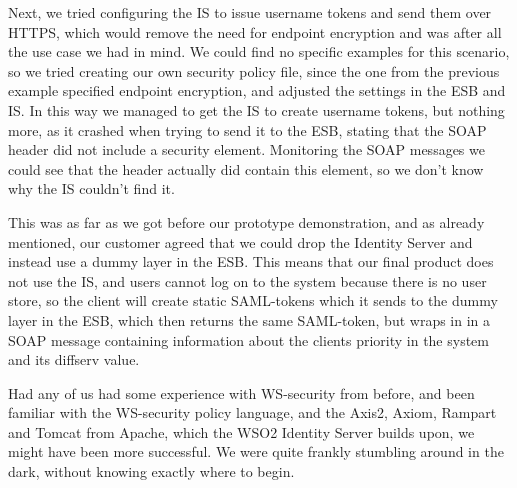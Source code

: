     Next, we tried configuring the IS to issue username tokens and send them over HTTPS, which would remove the need for endpoint encryption and was after all the use case we had in mind. We could find no specific examples for this scenario, so we tried creating our own security policy file, since the one from the previous example specified endpoint encryption, and adjusted the settings in the ESB and IS. In this way we managed to get the IS to create username tokens, but nothing more, as it crashed when trying to send it to the ESB, stating that the SOAP header did not include a security element. Monitoring the SOAP messages we could see that the header actually did contain this element, so we don't know why the IS couldn't find it.

    This was as far as we got before our prototype demonstration, and as already mentioned, our customer agreed that we could drop the Identity Server and instead use a dummy layer in the ESB. This means that our final product does not use the IS, and users cannot log on to the system because there is no user store, so the client will create static SAML-tokens which it sends to the dummy layer in the ESB, which then returns the same SAML-token, but wraps in in a SOAP message containing information about the clients priority in the system and its diffserv value.

    Had any of us had some experience with WS-security from before, and been familiar with the WS-security policy language, and the Axis2, Axiom, Rampart and Tomcat from Apache, which the WSO2 Identity Server builds upon,  we might have been more successful. We were quite frankly stumbling around in the dark, without knowing exactly where to begin.





